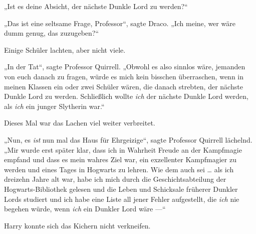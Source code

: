 „Ist es deine Absicht, der nächste Dunkle Lord zu werden?“

„Das ist eine seltsame Frage, Professor“, sagte Draco.
„Ich meine, wer wäre dumm genug, das zuzugeben?“

Einige Schüler lachten, aber nicht viele.

„In der Tat“, sagte Professor Quirrell.
„Obwohl es also sinnlos wäre, jemanden von euch danach zu fragen, würde es mich kein bisschen überraschen, wenn in meinen Klassen ein oder zwei Schüler wären, die danach strebten, der nächste Dunkle Lord zu werden. Schließlich wollte \emph{ich} der nächste Dunkle Lord werden, als \emph{ich} ein junger Slytherin war.“

Dieses Mal war das Lachen viel weiter verbreitet.

„Nun, es \emph{ist} nun mal das Haus für Ehrgeizige“, sagte Professor Quirrell lächelnd.
„Mir wurde erst später klar, dass ich in Wahrheit Freude an der Kampfmagie empfand und dass es mein wahres Ziel war, ein exzellenter Kampfmagier zu werden und eines Tages in Hogwarts zu lehren. Wie dem auch sei … als ich dreizehn Jahre alt war, habe ich mich durch die Geschichtsabteilung der Hogwarts-Bibliothek gelesen und die Leben und Schicksale früherer Dunkler Lords studiert und ich habe eine Liste all jener Fehler aufgestellt, die \emph{ich} nie begehen würde, wenn \emph{ich} ein Dunkler Lord wäre —“

Harry konnte sich das Kichern nicht verkneifen.

